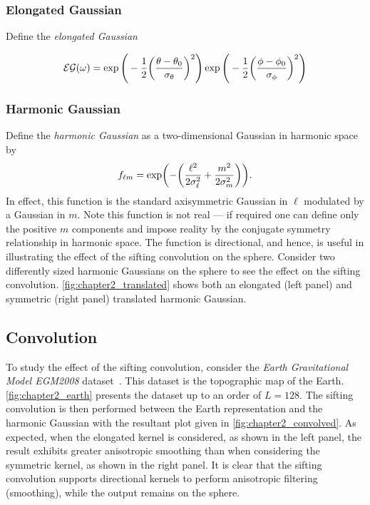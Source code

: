 

\subsubsection{Elongated Gaussian}

Define the \emph{elongated Gaussian}

\begin{equation}
	\mathcal{EG}(\omega)
	= \exp\Bigg(-\frac{1}{2}{\bigg(\frac{\theta-\theta_{0}}{\sigma_{\theta}}\bigg)}^{2}\Bigg)
	\exp\Bigg(-\frac{1}{2}{\bigg(\frac{\phi-\phi_{0}}{\sigma_{\phi}}\bigg)}^{2}\Bigg)
\end{equation}



\subsubsection{Harmonic Gaussian}

Define the \emph{harmonic Gaussian} as a two-dimensional Gaussian in harmonic space by
%
\begin{equation}
	{f}_{\ell m}
	= \exp(-\bigg(\frac{{\ell}^{2}}{2\sigma_{\ell}^{2}} + \frac{{m}^{2}}{2\sigma_{m}^{2}}\bigg)).
\end{equation}
%
In effect, this function is the standard axisymmetric Gaussian in \(\ell{}\) modulated by a Gaussian in \(m\).
Note this function is not real --- if required one can define only the positive \(m\) components and impose reality by the conjugate symmetry relationship in harmonic space.
The function is directional, and hence, is useful in illustrating the effect of the sifting convolution on the sphere.
Consider two differently sized harmonic Gaussians on the sphere to see the effect on the sifting convolution.
\cref{fig:chapter2_translated} shows both an elongated (left panel) and symmetric (right panel) translated harmonic Gaussian.





\subsection{Convolution}\label{sec:chapter2_convolution}

To study the effect of the sifting convolution, consider the \emph{Earth Gravitational Model EGM2008} dataset~\cite{Pavlis2013}.
This dataset is the topographic map of the Earth.
\cref{fig:chapter2_earth} presents the dataset up to an order of \(L=128\).
The sifting convolution is then performed between the Earth representation and the harmonic Gaussian with the resultant plot given in \cref{fig:chapter2_convolved}.
As expected, when the elongated kernel is considered, as shown in the left panel, the result exhibits greater anisotropic smoothing than when considering the symmetric kernel, as shown in the right panel.
It is clear that the sifting convolution supports directional kernels to perform anisotropic filtering (smoothing), while the output remains on the sphere.

